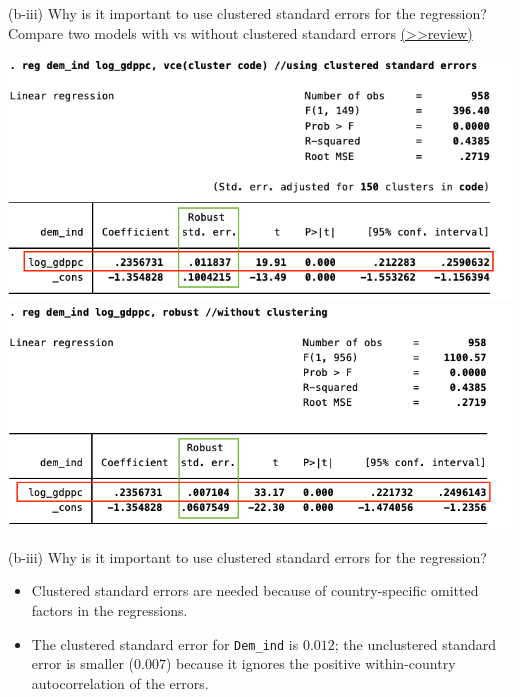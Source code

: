 \documentclass[
  10pt,
  ignorenonframetext,
]{beamer}
\providecommand{\tightlist}{%
  \setlength{\itemsep}{0pt}\setlength{\parskip}{0pt}}
\begin{document}
\begin{frame}{(b-iii) Why is it important to use clustered standard
errors \quad for the regression?}
\protect\hypertarget{b-iii-why-is-it-important-to-use-clustered-standard-errors-for-the-regression}{}
Compare two models with vs without clustered standard errors
\footnotesize \protect\hyperlink{ClusteredSE}{(\textgreater\textgreater review)}
\normalsize

\begin{center}\includegraphics[width=0.49\linewidth]{pictures/Ex2-pooledsimplewithclustering} \includegraphics[width=0.49\linewidth]{pictures/Ex2-pooledsimplemoclustering} \end{center}
\end{frame}

\begin{frame}[fragile]{(b-iii) Why is it important to use clustered
standard errors \quad for the regression?}
\protect\hypertarget{b-iii-why-is-it-important-to-use-clustered-standard-errors-for-the-regression-1}{}
\begin{itemize}
\tightlist
\item
  Clustered standard errors are needed because of country-specific
  omitted factors in the regressions.
\end{itemize}

\vspace{0.8mm}

\begin{itemize}
\tightlist
\item
  The clustered standard error for \texttt{Dem\_ind} is \(0.012\); the
  unclustered standard error is smaller (\(0.007\)) because it ignores
  the positive within-country autocorrelation of the errors.
\end{itemize}
\end{frame}
\end{document}
